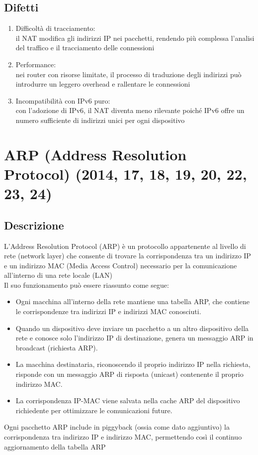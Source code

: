 \documentclass[10pt,oneside,a4paper]{article}
\begin{document}
\subsection{Difetti}
\begin{enumerate}
\item Difficoltà di tracciamento:\\
il NAT modifica gli indirizzi IP nei pacchetti, rendendo più complessa l'analisi del traffico e il tracciamento delle connessioni
\item Performance:\\
nei router con risorse limitate, il processo di traduzione degli indirizzi può introdurre un leggero overhead e rallentare le connessioni
\item Incompatibilità con IPv6 puro:\\
con l'adozione di IPv6, il NAT diventa meno rilevante poiché IPv6 offre un numero sufficiente di indirizzi unici per ogni dispositivo
\end{enumerate}
\section{ARP (Address Resolution Protocol) (2014, 17, 18, 19, 20, 22, 23, 24)}
\subsection{Descrizione}
L'Address Resolution Protocol (ARP) è un protocollo appartenente al livello di rete (network layer) che consente di trovare la corrispondenza tra un indirizzo IP e un indirizzo MAC (Media Access Control) necessario per la comunicazione all'interno di una rete locale (LAN)\\
Il suo funzionamento può essere riassunto come segue:
\begin{itemize}
\item Ogni macchina all'interno della rete mantiene una tabella ARP, che contiene le corrispondenze tra indirizzi IP e indirizzi MAC conosciuti.
\item Quando un dispositivo deve inviare un pacchetto a un altro dispositivo della rete e conosce solo l'indirizzo IP di destinazione, genera un messaggio ARP in broadcast (richiesta ARP).
\item La macchina destinataria, riconoscendo il proprio indirizzo IP nella richiesta, risponde con un messaggio ARP di risposta (unicast) contenente il proprio indirizzo MAC.
\item La corrispondenza IP-MAC viene salvata nella cache ARP del dispositivo richiedente per ottimizzare le comunicazioni future.
\end{itemize}
Ogni pacchetto ARP include in piggyback (ossia come dato aggiuntivo) la corrispondenza tra indirizzo IP e indirizzo MAC, permettendo così il continuo aggiornamento della tabella ARP
\end{document}
